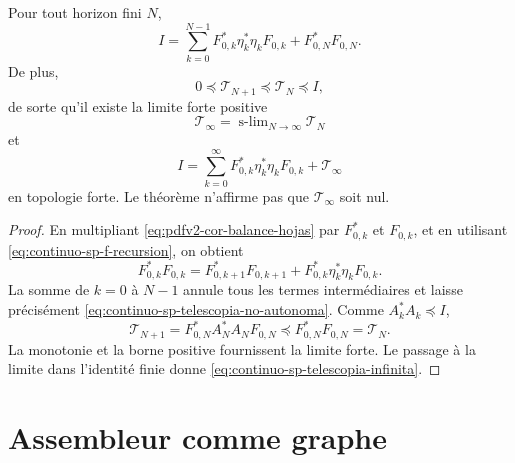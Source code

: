 \begin{theorem}
\label{thm:continuo-sp-telescopia-no-autonoma}
Pour tout horizon fini \(N\),
\begin{equation}
\label{eq:continuo-sp-telescopia-no-autonoma}
 \boxed{
 I=\sum_{k=0}^{N-1}
 F_{0,k}^*\eta_k^*\eta_kF_{0,k}
 +F_{0,N}^*F_{0,N}.}
\end{equation}
De plus,
\[
 0\preceq\mathcal T_{N+1}
 \preceq\mathcal T_N\preceq I,
\]
de sorte qu'il existe la limite forte positive
\[
 \mathcal T_\infty
 =\operatorname{s-lim}_{N\to\infty}\mathcal T_N
\]
et
\begin{equation}
\label{eq:continuo-sp-telescopia-infinita}
 I=\sum_{k=0}^{\infty}
 F_{0,k}^*\eta_k^*\eta_kF_{0,k}
 +\mathcal T_\infty
\end{equation}
en topologie forte. Le théorème n'affirme pas que
\(\mathcal T_\infty\) soit nul.
\end{theorem}

\begin{proof}
En multipliant \eqref{eq:pdfv2-cor-balance-hojas} par
\(F_{0,k}^*\) et \(F_{0,k}\), et en utilisant
\eqref{eq:continuo-sp-f-recursion}, on obtient
\[
 F_{0,k}^*F_{0,k}
 =F_{0,k+1}^*F_{0,k+1}
  +F_{0,k}^*\eta_k^*\eta_kF_{0,k}.
\]
La somme de \(k=0\) à \(N-1\) annule tous les termes
intermédiaires et laisse précisément
\eqref{eq:continuo-sp-telescopia-no-autonoma}. Comme
\(A_k^*A_k\preceq I\),
\[
 \mathcal T_{N+1}
 =F_{0,N}^*A_N^*A_NF_{0,N}
 \preceq F_{0,N}^*F_{0,N}=\mathcal T_N.
\]
La monotonie et la borne positive fournissent la limite forte. Le passage à la
limite dans l'identité finie donne
\eqref{eq:continuo-sp-telescopia-infinita}.
\end{proof}

\iffalse
\section{Assembleur comme graphe}

